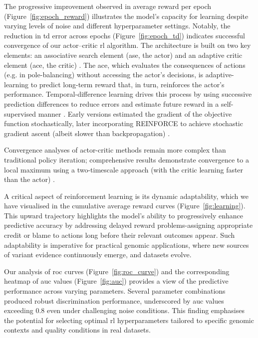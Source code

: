 The progressive improvement observed in average reward per epoch (Figure~\ref{fig:epoch_reward}) illustrates the model's capacity for learning despite varying levels of noise and different hyperparameter settings. Notably, the reduction in \ac{td} error across epochs (Figure~\ref{fig:epoch_td}) indicates successful convergence of our actor–critic \ac{rl} algorithm. The architecture is built on two key elements: an associative search element (\ac{ase}, the actor) and an adaptive critic element (\ac{ace}, the critic) \cite{sutton1998reinforcement}. 
The \ac{ace}, which evaluates the consequences of actions (e.g. in pole-balancing) without accessing the actor’s decisions, is adaptive-learning to predict long-term reward that, in turn, reinforces the actor's performance. Temporal-difference learning drives this process by using successive prediction differences to reduce errors and estimate future reward in a self-supervised manner \cite{sutton1998reinforcement}. 
Early versions estimated the gradient of the objective function stochastically, later incorporating REINFORCE to achieve stochastic gradient ascent (albeit slower than backpropagation) 
\cite{rumelhart1985learning,
barto1992gradient, 
williams1992simple}.

Convergence analyses of actor-critic methods remain more complex than traditional policy iteration; comprehensive results demonstrate convergence to a local maximum using a two-timescale approach (with the critic learning faster than the actor) \cite{bhatnagar2007naturalgradient}.

A critical aspect of reinforcement learning is its dynamic adaptability, which we have visualised in the cumulative average reward curves (Figure~\ref{fig:learning}). This upward trajectory highlights the model's ability to progressively enhance predictive accuracy by addressing delayed reward problems-assigning appropriate credit or blame to actions long before their relevant outcomes appear. Such adaptability is imperative for practical genomic applications, where new sources of variant evidence continuously emerge, and datasets evolve.

Our analysis of \ac{roc} curves (Figure~\ref{fig:roc_curve}) and the corresponding heatmap of \ac{auc} values (Figure~\ref{fig:auc}) provides a view of the predictive performance across varying parameters. Several parameter combinations produced robust discrimination performance, underscored by \ac{auc} values exceeding 0.8 even under challenging noise conditions. This finding emphasises the potential for selecting optimal \ac{rl} hyperparameters tailored to specific genomic contexts and quality conditions in real datasets.

